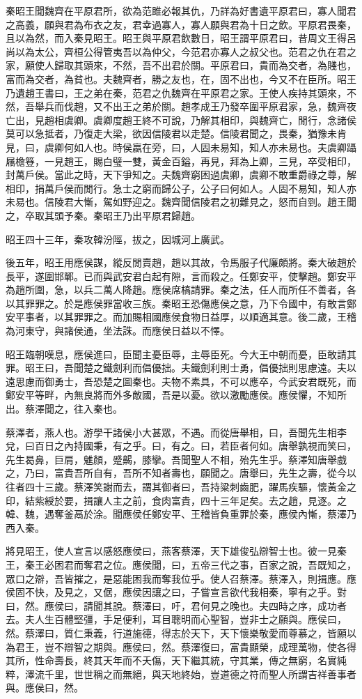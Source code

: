 秦昭王聞魏齊在平原君所，欲為范雎必報其仇，乃詳為好書遺平原君曰，寡人聞君之高義，願與君為布衣之友，君幸過寡人，寡人願與君為十日之飲。平原君畏秦，且以為然，而入秦見昭王。昭王與平原君飲數日，昭王謂平原君曰，昔周文王得呂尚以為太公，齊桓公得管夷吾以為仲父，今范君亦寡人之叔父也。范君之仇在君之家，願使人歸取其頭來，不然，吾不出君於關。平原君曰，貴而為交者，為賤也，富而為交者，為貧也。夫魏齊者，勝之友也，在，固不出也，今又不在臣所。昭王乃遺趙王書曰，王之弟在秦，范君之仇魏齊在平原君之家。王使人疾持其頭來，不然，吾舉兵而伐趙，又不出王之弟於關。趙孝成王乃發卒圍平原君家，急，魏齊夜亡出，見趙相虞卿。虞卿度趙王終不可說，乃解其相印，與魏齊亡，閒行，念諸侯莫可以急抵者，乃復走大梁，欲因信陵君以走楚。信陵君聞之，畏秦，猶豫未肯見，曰，虞卿何如人也。時侯嬴在旁，曰，人固未易知，知人亦未易也。夫虞卿躡屩檐簦，一見趙王，賜白璧一雙，黃金百鎰，再見，拜為上卿，三見，卒受相印，封萬戶侯。當此之時，天下爭知之。夫魏齊窮困過虞卿，虞卿不敢重爵祿之尊，解相印，捐萬戶侯而閒行。急士之窮而歸公子，公子曰何如人。人固不易知，知人亦未易也。信陵君大慚，駕如野迎之。魏齊聞信陵君之初難見之，怒而自剄。趙王聞之，卒取其頭予秦。秦昭王乃出平原君歸趙。

昭王四十三年，秦攻韓汾陘，拔之，因城河上廣武。

後五年，昭王用應侯謀，縱反閒賣趙，趙以其故，令馬服子代廉頗將。秦大破趙於長平，遂圍邯鄲。已而與武安君白起有隙，言而殺之。任鄭安平，使擊趙。鄭安平為趙所圍，急，以兵二萬人降趙。應侯席槁請罪。秦之法，任人而所任不善者，各以其罪罪之。於是應侯罪當收三族。秦昭王恐傷應侯之意，乃下令國中，有敢言鄭安平事者，以其罪罪之。而加賜相國應侯食物日益厚，以順適其意。後二歲，王稽為河東守，與諸侯通，坐法誅。而應侯日益以不懌。

昭王臨朝嘆息，應侯進曰，臣聞主憂臣辱，主辱臣死。今大王中朝而憂，臣敢請其罪。昭王曰，吾聞楚之鐵劍利而倡優拙。夫鐵劍利則士勇，倡優拙則思慮遠。夫以遠思慮而御勇士，吾恐楚之圖秦也。夫物不素具，不可以應卒，今武安君既死，而鄭安平等畔，內無良將而外多敵國，吾是以憂。欲以激勵應侯。應侯懼，不知所出。蔡澤聞之，往入秦也。

蔡澤者，燕人也。游學干諸侯小大甚眾，不遇。而從唐舉相，曰，吾聞先生相李兌，曰百日之內持國秉，有之乎。曰，有之。曰，若臣者何如。唐舉孰視而笑曰，先生曷鼻，巨肩，魋顏，蹙齃，膝攣。吾聞聖人不相，殆先生乎。蔡澤知唐舉戲之，乃曰，富貴吾所自有，吾所不知者壽也，願聞之。唐舉曰，先生之壽，從今以往者四十三歲。蔡澤笑謝而去，謂其御者曰，吾持粱刺齒肥，躍馬疾驅，懷黃金之印，結紫綬於要，揖讓人主之前，食肉富貴，四十三年足矣。去之趙，見逐。之韓、魏，遇奪釜鬲於涂。聞應侯任鄭安平、王稽皆負重罪於秦，應侯內慚，蔡澤乃西入秦。

將見昭王，使人宣言以感怒應侯曰，燕客蔡澤，天下雄俊弘辯智士也。彼一見秦王，秦王必困君而奪君之位。應侯聞，曰，五帝三代之事，百家之說，吾既知之，眾口之辯，吾皆摧之，是惡能困我而奪我位乎。使人召蔡澤。蔡澤入，則揖應。應侯固不快，及見之，又倨，應侯因讓之曰，子嘗宣言欲代我相秦，寧有之乎。對曰，然。應侯曰，請聞其說。蔡澤曰，吁，君何見之晚也。夫四時之序，成功者去。夫人生百體堅彊，手足便利，耳目聰明而心聖智，豈非士之願與。應侯曰，然。蔡澤曰，質仁秉義，行道施德，得志於天下，天下懷樂敬愛而尊慕之，皆願以為君王，豈不辯智之期與。應侯曰，然。蔡澤復曰，富貴顯榮，成理萬物，使各得其所，性命壽長，終其天年而不夭傷，天下繼其統，守其業，傳之無窮，名實純粹，澤流千里，世世稱之而無絕，與天地終始，豈道德之符而聖人所謂吉祥善事者與。應侯曰，然。

